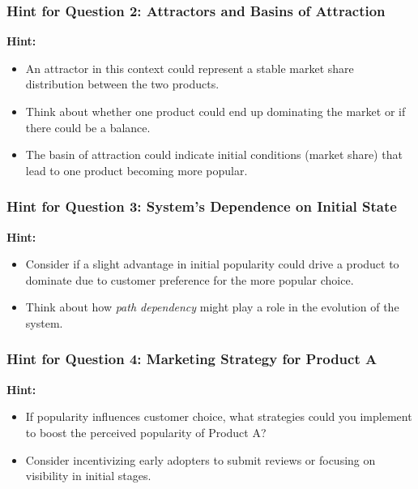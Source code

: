 \documentclass{beamer}
\begin{document}
\begin{frame}
    \frametitle{Hint for Question 2: Attractors and Basins of Attraction}

    \textbf{Hint:}
    \begin{itemize}
        \item An attractor in this context could represent a stable market share distribution between the two products.
        \item Think about whether one product could end up dominating the market or if there could be a balance.
        \item The basin of attraction could indicate initial conditions (market share) that lead to one product becoming more popular.
    \end{itemize}
\end{frame}

\begin{frame}
    \frametitle{Hint for Question 3: System's Dependence on Initial State}

    \textbf{Hint:}
    \begin{itemize}
        \item Consider if a slight advantage in initial popularity could drive a product to dominate due to customer preference for the more popular choice.
        \item Think about how \emph{path dependency} might play a role in the evolution of the system.
    \end{itemize}
\end{frame}

\begin{frame}
    \frametitle{Hint for Question 4: Marketing Strategy for Product A}

    \textbf{Hint:}
    \begin{itemize}
        \item If popularity influences customer choice, what strategies could you implement to boost the perceived popularity of Product A?
        \item Consider incentivizing early adopters to submit reviews or focusing on visibility in initial stages.
    \end{itemize}
\end{frame}
\end{document}
